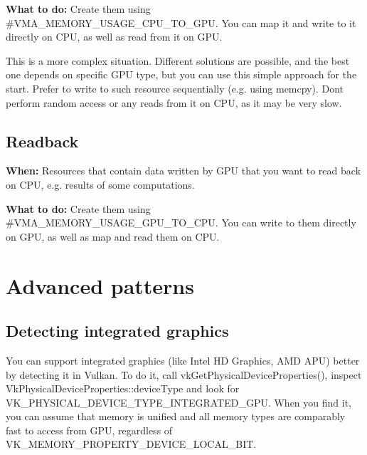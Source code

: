 {\bfseries What to do\+:} Create them using \#\+V\+M\+A\+\_\+\+M\+E\+M\+O\+R\+Y\+\_\+\+U\+S\+A\+G\+E\+\_\+\+C\+P\+U\+\_\+\+T\+O\+\_\+\+G\+PU. You can map it and write to it directly on C\+PU, as well as read from it on G\+PU.

This is a more complex situation. Different solutions are possible, and the best one depends on specific G\+PU type, but you can use this simple approach for the start. Prefer to write to such resource sequentially (e.\+g. using {\ttfamily memcpy}). Don\textquotesingle{}t perform random access or any reads from it on C\+PU, as it may be very slow.\hypertarget{usage_patterns_usage_patterns_readback}{}\subsection{Readback}\label{usage_patterns_usage_patterns_readback}
{\bfseries When\+:} Resources that contain data written by G\+PU that you want to read back on C\+PU, e.\+g. results of some computations.

{\bfseries What to do\+:} Create them using \#\+V\+M\+A\+\_\+\+M\+E\+M\+O\+R\+Y\+\_\+\+U\+S\+A\+G\+E\+\_\+\+G\+P\+U\+\_\+\+T\+O\+\_\+\+C\+PU. You can write to them directly on G\+PU, as well as map and read them on C\+PU.\hypertarget{usage_patterns_usage_patterns_advanced}{}\section{Advanced patterns}\label{usage_patterns_usage_patterns_advanced}
\hypertarget{usage_patterns_usage_patterns_integrated_graphics}{}\subsection{Detecting integrated graphics}\label{usage_patterns_usage_patterns_integrated_graphics}
You can support integrated graphics (like Intel HD Graphics, A\+MD A\+PU) better by detecting it in Vulkan. To do it, call {\ttfamily vk\+Get\+Physical\+Device\+Properties()}, inspect {\ttfamily Vk\+Physical\+Device\+Properties\+::device\+Type} and look for {\ttfamily V\+K\+\_\+\+P\+H\+Y\+S\+I\+C\+A\+L\+\_\+\+D\+E\+V\+I\+C\+E\+\_\+\+T\+Y\+P\+E\+\_\+\+I\+N\+T\+E\+G\+R\+A\+T\+E\+D\+\_\+\+G\+PU}. When you find it, you can assume that memory is unified and all memory types are comparably fast to access from G\+PU, regardless of {\ttfamily V\+K\+\_\+\+M\+E\+M\+O\+R\+Y\+\_\+\+P\+R\+O\+P\+E\+R\+T\+Y\+\_\+\+D\+E\+V\+I\+C\+E\+\_\+\+L\+O\+C\+A\+L\+\_\+\+B\+IT}.

